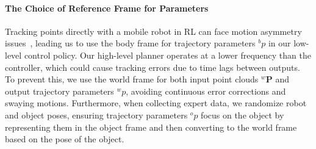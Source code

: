 \paragraph{The Choice of Reference Frame for Parameters}

Tracking points directly with a mobile robot in RL can face motion asymmetry issues~\cite{2019-MIG-symmetry, Advanced2022Rudin, hoeller2023anymal}, leading us to use the body frame for trajectory parameters ${}^{b}p$ in our low-level control policy. Our high-level planner operates at a lower frequency than the controller, which could cause tracking errors due to time lags between outputs. To prevent this, we use the world frame for both input point clouds ${}^{w}\mathbf{P}$ and output trajectory parameters ${}^{w}p$, avoiding continuous error corrections and swaying motions. Furthermore, when collecting expert data, we randomize robot and object poses, ensuring trajectory parameters ${}^{o}p$ focus on the object by representing them in the object frame and then converting to the world frame based on the pose of the object.


